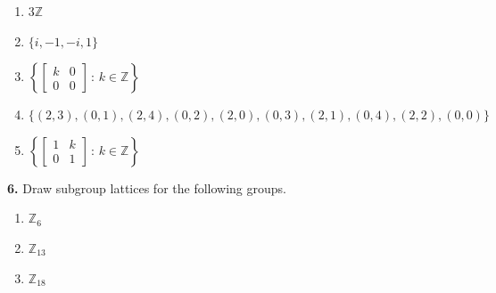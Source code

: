 \documentclass[10pt,]{book}
\theoremstyle{plain}
\theoremstyle{definition}
\theoremstyle{definition}
\theoremstyle{definition}
\theoremstyle{definition}
\numberwithin{equation}{section}
\def\Z{\mathbb{Z}}
\newcommand{\amp}{ & }
\begin{document}
\par\smallskip
\leavevmode%
\begin{enumerate}[label=(\alph*)]
\item\hypertarget{li-310}{}
          \(3\Z\)
\item\hypertarget{li-311}{}
          \(\{i,-1,-i,1\}\)
\item\hypertarget{li-312}{}
          \(\left\{\left[
          \begin{array}{cc}
          k \amp  0 \\
          0 \amp  0
          \end{array} 
          \right]\,:\,k\in \Z
          \right\}\)
\item\hypertarget{li-313}{}
          \(\{(2,3),(0,1),(2,4),(0,2),(2,0),(0,3),(2,1),(0,4),(2,2),(0,0)\}\)
\item\hypertarget{li-314}{}
          \(\left\{\left[
          \begin{array}{cc}
          1 \amp  k \\
          0 \amp  1
          \end{array} 
          \right]\,:\,k\in \Z\right\}\)
\end{enumerate}
\par\smallskip
\noindent\textbf{6.}\quad{}
        Draw subgroup lattices for the following groups.
        \leavevmode%
\begin{multicols}{3}
\begin{enumerate}[label=(\alph*)]
\item\hypertarget{li-315}{}
              \(\Z_6\)
\item\hypertarget{li-316}{}
              \(\Z_{13}\)
\item\hypertarget{li-317}{}
              \(\Z_{18}\)
\end{enumerate}
\end{multicols}
\end{document}
